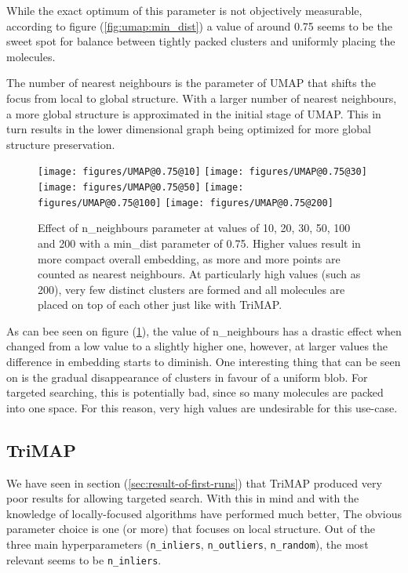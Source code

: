 While the exact optimum of this parameter is not objectively measurable, according to figure (\ref{fig:umap:min_dist}) a value of around 0.75 seems to be the sweet spot for balance between tightly packed clusters and uniformly placing the molecules. 

The number of nearest neighbours is the parameter of UMAP that shifts the focus from local to global structure. With a larger number of nearest neighbours, a more global structure is approximated in the initial stage of UMAP. This in turn results in the lower dimensional graph being optimized for more global structure preservation. 

\begin{figure}[!h]
	\centering
	\texttt{[image: figures/UMAP@0.75@10]}
	\texttt{[image: figures/UMAP@0.75@30]}
	\texttt{[image: figures/UMAP@0.75@50]}
	\texttt{[image: figures/UMAP@0.75@100]}
	\texttt{[image: figures/UMAP@0.75@200]}
	\caption{Effect of n\_neighbours parameter at values of 10, 20, 30, 50, 100 and 200 with a min\_dist parameter of 0.75. Higher values result in more compact overall embedding, as more and more points are counted as nearest neighbours. At particularly high values (such as 200), very few distinct clusters are formed and all molecules are placed on top of each other just like with TriMAP.}
	\label{fig:umap:n_neighbor}
\end{figure}

As can bee seen on figure (\ref{fig:umap:n_neighbor}), the value of n\_neighbours has a drastic effect when changed from a low value to a slightly higher one, however, at larger values the difference in embedding starts to diminish. One interesting thing that can be seen on is the gradual disappearance of clusters in favour of a uniform blob. For targeted searching, this is potentially bad, since so many molecules are packed into one space. For this reason, very high values are undesirable for this use-case.

\subsection{TriMAP}

We have seen in section (\ref{sec:result-of-first-runs}) that TriMAP produced very poor results for allowing targeted search. With this in mind and with the knowledge of locally-focused algorithms have performed much better, The obvious parameter choice is one (or more) that focuses on local structure. Out of the three main hyperparameters (\texttt{n\_inliers}, \texttt{n\_outliers}, \texttt{n\_random}), the most relevant seems to be \texttt{n\_inliers}.

